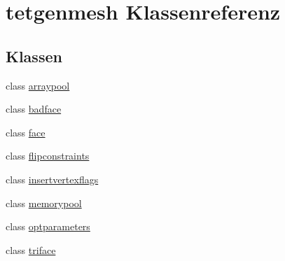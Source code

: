 \hypertarget{classtetgenmesh}{\section{tetgenmesh Klassenreferenz}
\label{classtetgenmesh}
}
\subsection*{Klassen}
\begin{DoxyCompactItemize}
\item 
class \hyperlink{classtetgenmesh_1_1arraypool}{arraypool}
\item 
class \hyperlink{classtetgenmesh_1_1badface}{badface}
\item 
class \hyperlink{classtetgenmesh_1_1face}{face}
\item 
class \hyperlink{classtetgenmesh_1_1flipconstraints}{flipconstraints}
\item 
class \hyperlink{classtetgenmesh_1_1insertvertexflags}{insertvertexflags}
\item 
class \hyperlink{classtetgenmesh_1_1memorypool}{memorypool}
\item 
class \hyperlink{classtetgenmesh_1_1optparameters}{optparameters}
\item 
class \hyperlink{classtetgenmesh_1_1triface}{triface}
\end{DoxyCompactItemize}
